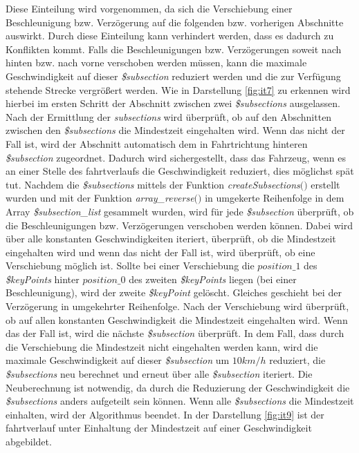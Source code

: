 Diese Einteilung wird vorgenommen, da sich die Verschiebung einer Beschleunigung bzw. Verzögerung auf die folgenden bzw. vorherigen Abschnitte auswirkt. Durch diese Einteilung kann verhindert werden, dass es dadurch zu Konflikten kommt. Falls die Beschleunigungen bzw. Verzögerungen soweit nach hinten bzw. nach vorne verschoben werden müssen, kann die maximale Geschwindigkeit auf dieser \textit{\$subsection} reduziert werden und die zur Verfügung stehende Strecke vergrößert werden. Wie in Darstellung \ref{fig:it7} zu erkennen wird hierbei im ersten Schritt der Abschnitt zwischen zwei \textit{\$subsections} ausgelassen. Nach der Ermittlung der \textit{subsections} wird überprüft, ob auf den Abschnitten zwischen den \textit{\$subsections} die Mindestzeit eingehalten wird. Wenn das nicht der Fall ist, wird der Abschnitt automatisch dem in Fahrtrichtung hinteren \textit{\$subsection} zugeordnet. Dadurch wird sichergestellt, dass das Fahrzeug, wenn es an einer Stelle des \Gls{fahrtverlauf}s die Geschwindigkeit reduziert, dies möglichst spät tut.
Nachdem die \textit{\$subsections} mittels der Funktion \textit{createSubsections$($$)$} erstellt wurden und mit der Funktion \textit{array\_reverse$($$)$} in umgekerte Reihenfolge in dem Array \textit{\$subsection\_list} gesammelt wurden, wird für jede \textit{\$subsection} überprüft, ob die Beschleunigungen bzw. Verzögerungen verschoben werden können. Dabei wird über alle konstanten Geschwindigkeiten iteriert, überprüft, ob die Mindestzeit eingehalten wird und wenn das nicht der Fall ist, wird überprüft, ob eine Verschiebung möglich ist. Sollte bei einer Verschiebung die $position\_1$ des \textit{\$keyPoints} hinter $position\_0$ des zweiten \textit{\$keyPoints} liegen (bei einer Beschleunigung), wird der zweite \textit{\$keyPoint} gelöscht. Gleiches geschieht bei der Verzögerung in umgekehrter Reihenfolge. Nach der Verschiebung wird überprüft, ob auf allen konstanten Geschwindigkeit die Mindestzeit eingehalten wird. Wenn das der Fall ist, wird die nächste \textit{\$subsection} überprüft. In dem Fall, dass durch die Verschiebung die Mindestzeit nicht eingehalten werden kann, wird die maximale Geschwindigkeit auf dieser \textit{\$subsection} um $10 km/h$ reduziert, die \textit{\$subsections} neu berechnet und erneut über alle \textit{\$subsection} iteriert. Die Neuberechnung ist notwendig, da durch die Reduzierung der Geschwindigkeit die \textit{\$subsections} anders aufgeteilt sein können.
Wenn alle \textit{\$subsections} die Mindestzeit einhalten, wird der Algorithmus beendet. In der Darstellung \ref{fig:it9} ist der \Gls{fahrtverlauf} unter Einhaltung der Mindestzeit auf einer Geschwindigkeit abgebildet.

